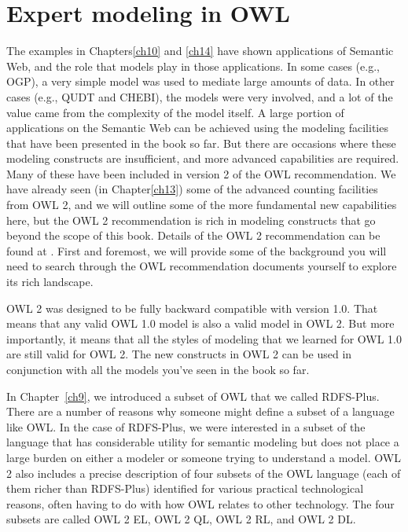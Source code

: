 \chapter{Expert modeling in OWL}
\label{ch16}

The examples in Chapters\ref{ch10} and \ref{ch14} have shown applications of Semantic
Web, and the role that models play in those applications. In some cases
(e.g., OGP), a very simple model was used to mediate large amounts of
data. In other cases (e.g., QUDT and CHEBI), the models were very
involved, and a lot of the value came from the complexity of the model
itself. A large portion of applications on the Semantic Web can be
achieved using the modeling facilities that have been presented in the
book so far. But there are occasions where these modeling constructs are
insufficient, and more advanced capabilities are required. Many of these
have been included in version 2 of the OWL recommendation. We have already
seen (in Chapter\ref{ch13}) some of the advanced counting facilities from OWL
2, and we will outline some of the more fundamental new capabilities
here, but the OWL 2 recommendation is rich in modeling constructs that go
beyond the scope of this book.  Details of the OWL 2 recommendation can be found at
\cite{Parsia:12:OWO}. First and foremost, we will provide some
of the background you will need to search through the OWL recommendation
documents yourself to explore its rich landscape.

OWL 2 was designed to be fully backward compatible with version 1.0.
That means that any valid OWL 1.0 model is also a valid model in OWL 2.
But more importantly, it means that all the styles of modeling that we
learned for OWL 1.0 are still valid for OWL 2. The new constructs in OWL
2 can be used in conjunction with all the models you've seen in the book
so far.

In Chapter~\ref{ch9}, we introduced a subset of OWL that we called RDFS-Plus.
There are a number of reasons why someone might define a subset of a
language like OWL. In the case of RDFS-Plus, we were interested in a
subset of the language that has considerable utility for semantic
modeling but does not place a large burden on either a modeler or
someone trying to understand a model. OWL 2 also includes a precise
description of four subsets of the OWL language (each of them richer
than RDFS-Plus) identified for various practical technological reasons,
often having to do with how OWL relates to other technology. The four
subsets are called OWL 2 EL, OWL 2 QL, OWL 2 RL, and OWL 2 DL.



